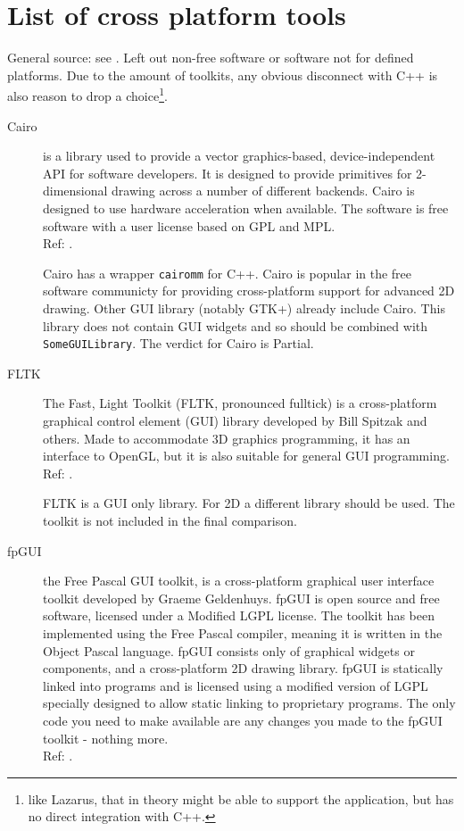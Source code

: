 \section{List of cross platform tools}

General source: see \cite{wiki:xplatf}. Left out non-free software or software
not for defined platforms. Due to the amount of toolkits, any obvious
disconnect with C++ is also reason to drop a choice\footnote{like Lazarus, that
in theory might be able to support the application, but has no direct
integration with C++.}.

\begin{description}
    \item[Cairo] is a library used to provide a vector graphics-based,
		device-independent API for software developers. It is designed
		to provide primitives for 2-dimensional drawing across a number
		of different backends. Cairo is designed to use hardware
		acceleration when available.
		The software is free software with a user license based on GPL
		and MPL.
		\hspace*{\fill}\\Ref: \cite{wiki:cairo}.

		Cairo has a wrapper \verb!cairomm! for C++.  Cairo is popular in the
		free software communicty for providing cross-platform support for
		advanced 2D drawing. Other GUI library (notably GTK+) already include
		Cairo. This library does not contain GUI widgets and so should be
		combined with \verb!SomeGUILibrary!. The verdict for Cairo is Partial.

    \item[FLTK] The Fast, Light Toolkit (FLTK, pronounced fulltick) is a
		cross-platform graphical control element (GUI)
		library developed by Bill Spitzak and others. Made to
		accommodate 3D graphics programming, it has an interface to
		OpenGL, but it is also suitable for general GUI programming.
		\hspace*{\fill}\\Ref: \cite{wiki:fltk}.

		FLTK is a GUI only library. For 2D a different library should be used.
		The toolkit is not included in the final comparison.

    \item[fpGUI] the Free Pascal GUI toolkit, is a cross-platform
		graphical user interface toolkit developed by Graeme Geldenhuys.
		fpGUI is open source and free software, licensed under a Modified LGPL
		license. The toolkit has been implemented using the Free Pascal
		compiler, meaning it is written in the Object Pascal language.
		fpGUI consists only of graphical widgets or components, and a
		cross-platform 2D drawing library.
		fpGUI is statically linked into programs and is licensed using a
		modified version of LGPL specially designed to allow static linking to
		proprietary programs. The only code you need to make available are
		any changes you made to the fpGUI toolkit - nothing more.
		\hspace*{\fill}\\Ref: \cite{wiki:fpgui}.


\end{description}

